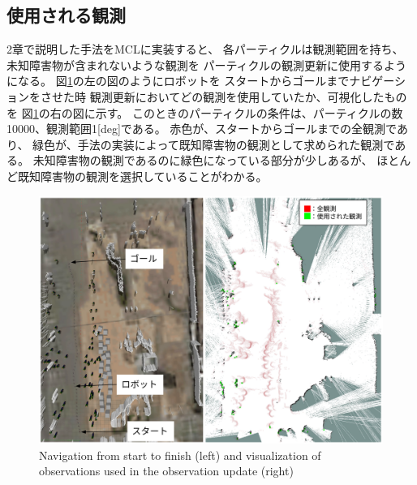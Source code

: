 \documentclass{jarticle}
\begin{document}
\subsection{使用される観測}

2章で説明した手法をMCLに実装すると、
各パーティクルは観測範囲を持ち、
未知障害物が含まれないような観測を
パーティクルの観測更新に使用するようになる。
図\ref{fig:スタートからゴールまでナビゲーション}の左の図のようにロボットを
スタートからゴールまでナビゲーションをさせた時
観測更新においてどの観測を使用していたか、可視化したものを
図\ref{fig:スタートからゴールまでナビゲーション}の右の図に示す。
このときのパーティクルの条件は、パーティクルの数10000、観測範囲1[deg]である。
赤色が、スタートからゴールまでの全観測であり、
緑色が、手法の実装によって既知障害物の観測として求められた観測である。
未知障害物の観測であるのに緑色になっている部分が少しあるが、
ほとんど既知障害物の観測を選択していることがわかる。

\begin{figure}[t]
  \centering
   \includegraphics[width=0.8\linewidth]{fig/particle_1000_observation_1_mcl.png}
   \vspace*{-4mm}
   \caption{Navigation from start to finish (left) and visualization of observations used in the observation update (right)}
   \label{fig:スタートからゴールまでナビゲーション}
\end{figure}


\end{document}
